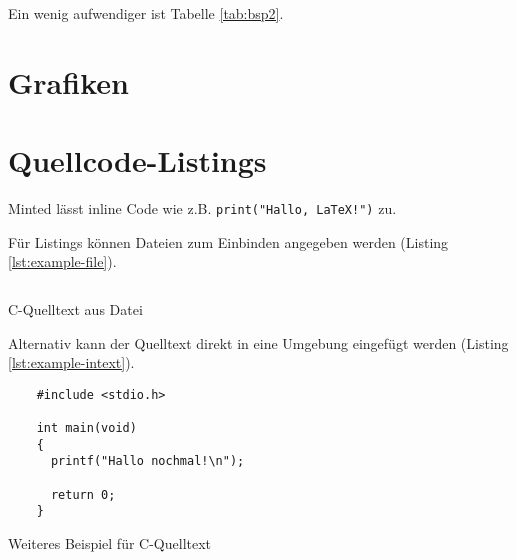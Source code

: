 Ein wenig aufwendiger ist Tabelle \ref{tab:bsp2}.


\begin{table}[!htbp]
  \caption{Tabelle mit , farbigen Zellen und Multicolumn.}
  \label{tab:bsp2}
\end{table}

\section{Grafiken}

\section{Quellcode-Listings}

Minted lässt inline Code wie z.B. \texttt{print("Hallo, LaTeX!")} zu.

Für Listings können Dateien zum Einbinden angegeben werden (Listing \ref{lst:example-file}).

\begin{listing}[!htbp]
  \inputminted{c}{./anlagen/exampleCode.c}
  \caption{C-Quelltext aus Datei}
  \label{lst:example-file}
\end{listing}

Alternativ kann der Quelltext direkt in eine  Umgebung eingefügt werden (Listing \ref{lst:example-intext}).

\begin{listing}[!htbp]
  \begin{verbatim}
    #include <stdio.h>

    int main(void)
    {
      printf("Hallo nochmal!\n");

      return 0;
    }
  \end{verbatim}
  \caption{Weiteres Beispiel für C-Quelltext}
  \label{lst:example-intext}
\end{listing}

